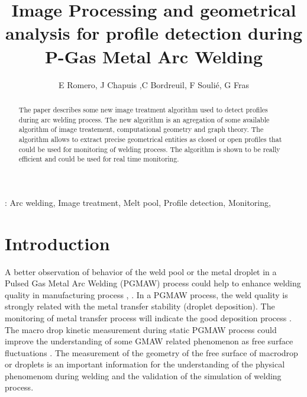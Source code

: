 \documentclass[12pt]{iopart}
\begin{document}


\title[Image Processing  for  profile detection during PGMAW]
{Image Processing and geometrical analysis for  profile detection during P-Gas Metal Arc Welding}

\author{E Romero, J Chapuis ,C Bordreuil, F Souli\'e, G Fras}

\address{Laboratoire de M\'ecanique et G\'enie Civil,
CC048, Place Eug\`ene Bataillon, Universit\'e Montpellier 2,
34095 Montpellier, France}

\begin{abstract}
The paper describes some new image treatment algorithm used to 
detect profiles during arc welding process. The new algorithm 
is an agregation of some available algorithm of image treatement,
computational geometry and graph theory. The algorithm allows to extract precise
geometrical entities as closed or open profiles that could be used for monitoring
of welding process. The algorithm  is shown to be really efficient
and could be used for real time monitoring.
\end{abstract}

: Arc welding, Image treatment, Melt pool,  Profile detection, Monitoring, 
\submitto{\MST}
\maketitle

\section{Introduction}

A better observation of behavior of the weld pool or the metal droplet 
in a Pulsed Gas Metal Arc Welding (PGMAW)
 process could help to enhance welding quality in manufacturing process \cite{LIN}, \cite{WU1}.
 In a PGMAW process, the weld quality is strongly related with the metal transfer  stability 
 (droplet deposition). The monitoring of metal transfer process
 will indicate the good deposition process \cite{WANG}. 
The macro drop kinetic measurement during static PGMAW process could improve the
understanding of some GMAW related phenomenon  \cite{CHO} as free surface 
fluctuations \cite{WANG}. The measurement of the geometry of the free surface 
of macrodrop or droplets is an important information for the understanding of the physical phenomenom 
during welding and the validation of the simulation of welding process.
\end{document}

